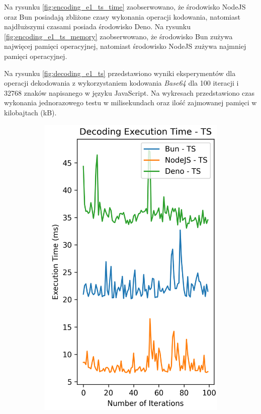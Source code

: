 Na rysunku \ref{fig:encoding_e1_ts_time} zaobserwowano, że środowisko NodeJS oraz Bun posiadają zbliżone czasy wykonania operacji kodowania, natomiast najdłuższymi czasami posiada środowisko Deno. Na rysunku \ref{fig:encoding_e1_ts_memory} zaobserwowano, że środowisko Bun zużywa najwięcej pamięci operacyjnej, natomiast środowisko NodeJS zużywa najmniej pamięci operacyjnej.

Na rysunku \ref{fig:decoding_e1_ts} przedstawiono wyniki eksperymentów dla operacji dekodowania z wykorzystaniem kodowania \textit{Base64} dla 100 iteracji i 32768 znaków napisanego w języku JavaScript. Na wykresach przedstawiono czas wykonania jednorazowego testu w milisekundach oraz ilość zajmowanej pamięci w kilobajtach (kB).

\begin{figure}[H]
  \centering
  \begin{subfigure}[b]{0.42\textwidth}
    \centering
    \includegraphics[width=\textwidth]{Figures/coding/base64_100_decoding_ts_time.png}

\end{subfigure}
\end{figure}
